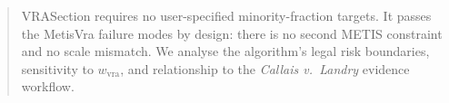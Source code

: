 \documentclass[12pt]{article}
\begin{document}
\begin{abstract}
VRASection requires no user-specified minority-fraction targets.
It passes the MetisVra failure modes by design: there is no second METIS
constraint and no scale mismatch.
We analyse the algorithm's legal risk boundaries, sensitivity to
$w_\text{vra}$, and relationship to the \emph{Callais v.\ Landry} evidence
workflow.
\end{abstract}










\end{document}
